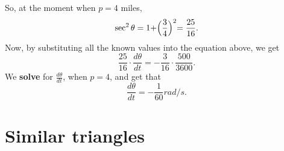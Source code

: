\documentclass{ximera}
\begin{document}
\begin{example}
\begin{explanation}
\begin{image}
			\end{image}
			
			So, at the moment when $p=4$ miles,
			\[
			\sec^2{\theta}=1+\Bigr(\frac{3}{4}\Bigl)^2=\frac{25}{16}.
			\] 
			Now, by substituting all the known values into the equation above, we get
			\[
			\frac{25}{16}\cdot \frac{d\theta}{dt}= -\frac{3}{16}\cdot \frac{500}{3600}.
			\] 
			We \textbf{solve} for $\frac{d\theta}{dt}$, when $p=4$, and get that
			\[
			\frac{d\theta}{dt} = -\frac{1}{60}  rad/s.
			\] 
		\end{explanation}
	\end{example}
	
	\section{Similar triangles}
	
\end{document}
